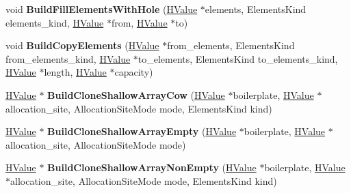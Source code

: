 \begin{DoxyCompactItemize}
\item 
\hypertarget{classv8_1_1internal_1_1_h_graph_builder_aa4021cd426c1d0f45e9e25140b238856}{}void {\bfseries Build\+Fill\+Elements\+With\+Hole} (\hyperlink{classv8_1_1internal_1_1_h_value}{H\+Value} $\ast$elements, Elements\+Kind elements\+\_\+kind, \hyperlink{classv8_1_1internal_1_1_h_value}{H\+Value} $\ast$from, \hyperlink{classv8_1_1internal_1_1_h_value}{H\+Value} $\ast$to)\label{classv8_1_1internal_1_1_h_graph_builder_aa4021cd426c1d0f45e9e25140b238856}

\item 
\hypertarget{classv8_1_1internal_1_1_h_graph_builder_a37b5be1f7c7022e2a76725ca868e5d90}{}void {\bfseries Build\+Copy\+Elements} (\hyperlink{classv8_1_1internal_1_1_h_value}{H\+Value} $\ast$from\+\_\+elements, Elements\+Kind from\+\_\+elements\+\_\+kind, \hyperlink{classv8_1_1internal_1_1_h_value}{H\+Value} $\ast$to\+\_\+elements, Elements\+Kind to\+\_\+elements\+\_\+kind, \hyperlink{classv8_1_1internal_1_1_h_value}{H\+Value} $\ast$length, \hyperlink{classv8_1_1internal_1_1_h_value}{H\+Value} $\ast$capacity)\label{classv8_1_1internal_1_1_h_graph_builder_a37b5be1f7c7022e2a76725ca868e5d90}

\item 
\hypertarget{classv8_1_1internal_1_1_h_graph_builder_ab5295ae9645f6b3c993226674181bcee}{}\hyperlink{classv8_1_1internal_1_1_h_value}{H\+Value} $\ast$ {\bfseries Build\+Clone\+Shallow\+Array\+Cow} (\hyperlink{classv8_1_1internal_1_1_h_value}{H\+Value} $\ast$boilerplate, \hyperlink{classv8_1_1internal_1_1_h_value}{H\+Value} $\ast$allocation\+\_\+site, Allocation\+Site\+Mode mode, Elements\+Kind kind)\label{classv8_1_1internal_1_1_h_graph_builder_ab5295ae9645f6b3c993226674181bcee}

\item 
\hypertarget{classv8_1_1internal_1_1_h_graph_builder_aa983c3ae8946fd9960bfa810d829790a}{}\hyperlink{classv8_1_1internal_1_1_h_value}{H\+Value} $\ast$ {\bfseries Build\+Clone\+Shallow\+Array\+Empty} (\hyperlink{classv8_1_1internal_1_1_h_value}{H\+Value} $\ast$boilerplate, \hyperlink{classv8_1_1internal_1_1_h_value}{H\+Value} $\ast$allocation\+\_\+site, Allocation\+Site\+Mode mode)\label{classv8_1_1internal_1_1_h_graph_builder_aa983c3ae8946fd9960bfa810d829790a}

\item 
\hypertarget{classv8_1_1internal_1_1_h_graph_builder_affe37995e06f744d1786487ef8c0d119}{}\hyperlink{classv8_1_1internal_1_1_h_value}{H\+Value} $\ast$ {\bfseries Build\+Clone\+Shallow\+Array\+Non\+Empty} (\hyperlink{classv8_1_1internal_1_1_h_value}{H\+Value} $\ast$boilerplate, \hyperlink{classv8_1_1internal_1_1_h_value}{H\+Value} $\ast$allocation\+\_\+site, Allocation\+Site\+Mode mode, Elements\+Kind kind)\label{classv8_1_1internal_1_1_h_graph_builder_affe37995e06f744d1786487ef8c0d119}


\end{DoxyCompactItemize}
